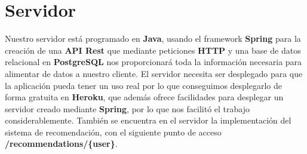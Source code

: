 \section{Servidor}
\label{makereference4.2}
Nuestro servidor está programado en \textbf{Java}, usando el framework \textbf{Spring} para la creación de una \textbf{API Rest} que mediante peticiones \textbf{HTTP} y una base de datos relacional en \textbf{PostgreSQL} nos proporcionará
toda la información necesaria para alimentar de datos a nuestro cliente. El servidor necesita ser desplegado para que la aplicación pueda tener un uso real por lo que conseguimos desplegarlo de forma gratuita en \textbf{Heroku}, que además ofrece
facilidades para desplegar un servidor creado mediante \textbf{Spring}, por lo que nos facilitó el trabajo considerablemente. También se encuentra en el servidor la implementación del sistema de recomendación, con el siguiente punto de acceso \textbf{/recommendations/\{user\}}.
